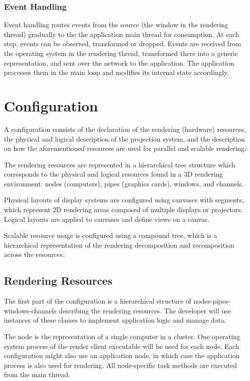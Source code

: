 \subsubsection{Event Handling}

Event handling routes events from the source (the window in the rendering
thread) gradually to the the application main thread for consumption. At each
step, events can be observed, transformed or dropped. Events are received from
the operating system in the rendering thread, transformed there into a generic
representation, and sent over the network to the application. The application
processes them in the main loop and modifies its internal state accordingly.


\section{Configuration}

A configuration consists of the declaration of the rendering (hardware)
resources, the physical and logical  description of the projection system, and
the description on how the  aforementioned resources are used for parallel and
scalable rendering.

The rendering resources are represented in a hierarchical tree structure
which corresponds to the physical and logical resources found in a 3D
rendering environment: nodes (computers), pipes (graphics cards),
windows, and channels.

Physical layouts of display systems are configured using canvases with
segments, which represent 2D rendering areas composed of multiple
displays or projectors. Logical layouts are applied to canvases and
define views on a canvas.

Scalable resource usage is configured using a compound tree, which is a
hierarchical representation of the rendering decomposition and
recomposition across the resources.

\subsection{Rendering Resources}

The first part of the configuration is a hierarchical structure of
nodes-pipes-win\-dows-channels describing the rendering resources. The developer
will use instances of these classes to implement application logic and manage
data.

The \textsf{node} is the representation of a single computer in a cluster. One operating
system process of the render client executable will be used for each node. Each
configuration might also use an application node, in which case the application
process is also used for rendering. All node-specific task methods are executed
from the main thread.

